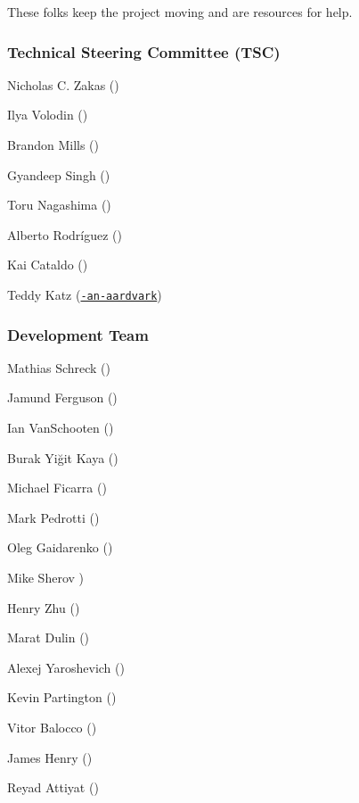These folks keep the project moving and are resources for help.

\subsubsection*{Technical Steering Committee (T\+SC)}


\begin{DoxyItemize}
\item Nicholas C. Zakas (\href{https://github.com/nzakas}{\tt })
\item Ilya Volodin (\href{https://github.com/ilyavolodin}{\tt })
\item Brandon Mills (\href{https://github.com/btmills}{\tt })
\item Gyandeep Singh (\href{https://github.com/gyandeeps}{\tt })
\item Toru Nagashima (\href{https://github.com/mysticatea}{\tt })
\item Alberto Rodríguez (\href{https://github.com/alberto}{\tt })
\item Kai Cataldo (\href{https://github.com/kaicataldo}{\tt })
\item Teddy Katz (\href{https://github.com/not-an-aardvark}{\tt -\/an-\/aardvark})
\end{DoxyItemize}

\subsubsection*{Development Team}


\begin{DoxyItemize}
\item Mathias Schreck (\href{https://github.com/lo1tuma}{\tt })
\item Jamund Ferguson (\href{https://github.com/xjamundx}{\tt })
\item Ian Van\+Schooten (\href{https://github.com/ianvs}{\tt })
\item Burak Yiğit Kaya (\href{https://github.com/byk}{\tt })
\item Michael Ficarra (\href{https://github.com/michaelficarra}{\tt })
\item Mark Pedrotti (\href{https://github.com/pedrottimark}{\tt })
\item Oleg Gaidarenko (\href{https://github.com/markelog}{\tt })
\item Mike Sherov \href{https://github.com/mikesherov}{\tt })
\item Henry Zhu (\href{https://github.com/hzoo}{\tt })
\item Marat Dulin (\href{https://github.com/mdevils}{\tt })
\item Alexej Yaroshevich (\href{https://github.com/zxqfox}{\tt })
\item Kevin Partington (\href{https://github.com/platinumazure}{\tt })
\item Vitor Balocco (\href{https://github.com/vitorbal}{\tt })
\item James Henry (\href{https://github.com/JamesHenry}{\tt })
\item Reyad Attiyat (\href{https://github.com/soda0289}{\tt })
\end{DoxyItemize}

